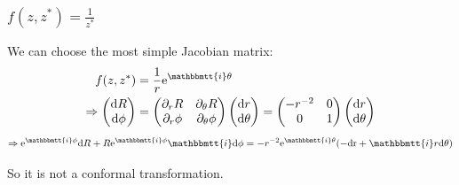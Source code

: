 \documentclass[]{ctexart}
\newcommand{\mi}{\mathbbmtt{i}}
\newcommand{\di}{\mathrm{d}}
\newcommand{\pa}{\partial}
\newcommand{\me}{\mathrm{e}}
\begin{document}
		\subsubsection{$f(z,z^*)=\frac{1}{z^*}$}
			We can choose the most simple Jacobian  matrix:
				\begin{equation*}
				\begin{aligned}
					f(z,z^*)&=\frac{1}{r}\me ^{\mi \theta}\\
					\Rightarrow 
					 \begin{pmatrix}
						 \di R\\
						 \di \phi
					 \end{pmatrix}
					 &=
					 \begin{pmatrix}
						 \pa_rR & \pa_{\theta}R\\
						 \pa_r\phi & \pa_{\theta}\phi
					 \end{pmatrix}
					 \begin{pmatrix}
						 \di r\\
						 \di \theta
					 \end{pmatrix}
					 =
					 \begin{pmatrix}
						 -r^{-2} & 0\\
						 0 & 1
					 \end{pmatrix}
					 \begin{pmatrix}
						 \di r\\
						 \di \theta
					 \end{pmatrix}
				\end{aligned}
				\end{equation*}
				\begin{equation*}
				\begin{aligned}
					\Rightarrow \me ^{\mi \phi }\di R+R\me ^{\mi \phi}\mi \di \phi=-r^{-2}\me ^{\mi \theta}(-\text{dr}+\mi  r\text{d}\theta)
				\end{aligned}
				\end{equation*}
			
			So it is not a conformal transformation. 
			
\end{document}
